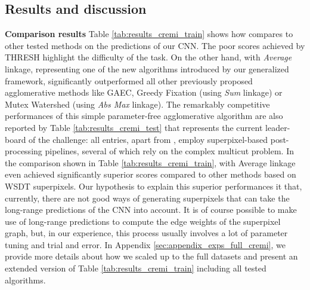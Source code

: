 


\subsection{Results and discussion}\label{sec:results}
\textbf{Comparison results } Table \ref{tab:results_cremi_train} shows how \algname{} compares to other tested methods on the predictions of our CNN. 
The poor scores achieved by THRESH highlight the difficulty of the task. On the other hand, \algname{} with \emph{Average} linkage, representing one of the new algorithms introduced by our generalized framework, significantly outperformed all other previously proposed agglomerative methods like GAEC, Greedy Fixation (using \emph{Sum} linkage) or Mutex Watershed (using \emph{Abs Max} linkage). The remarkably competitive performances of this simple parameter-free agglomerative algorithm are also reported by Table \ref{tab:results_cremi_test} that represents the current leader-board of the challenge: all entries, apart from \algname{}, employ superpixel-based post-processing pipelines, several of which rely on the complex multicut problem. 
In the comparison shown in Table \ref{tab:results_cremi_train}, \algname{} with Average linkage even achieved significantly superior scores compared to other methods based on WSDT superpixels.
Our hypothesis to explain this superior performances it that, currently, there are not good ways of generating superpixels that can take the long-range predictions of the CNN into account. It is of course possible to make use of long-range predictions to compute the edge weights of the superpixel graph, but, in our experience, this process usually involves a lot of parameter tuning and trial and error. 
In Appendix \ref{sec:appendix_exps_full_cremi}, we provide more details about how we scaled up \algname{} to the full datasets and present an extended version of Table \ref{tab:results_cremi_train} including all tested \algname{} algorithms.




